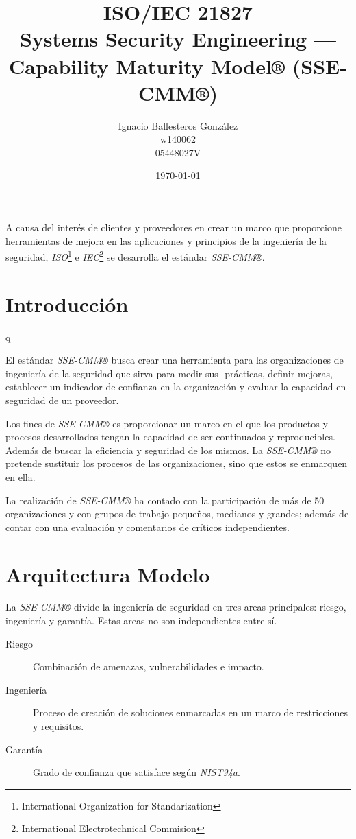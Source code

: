 \documentclass[11pt,a4paper]{article}
\title{
  ISO/IEC 21827\\
  Systems Security Engineering — Capability Maturity Model® (SSE-CMM®)
}
\author{\begin{tabular}[center]{c}
          Ignacio Ballesteros González \\
          \small w140062 \\
          \small 05448027V \\
        \end{tabular}
      }
\date{\today}
\begin{document}
\maketitle

A causa del interés de clientes y proveedores en crear un marco que
proporcione herramientas de mejora en las aplicaciones y principios de
la ingeniería de la seguridad, \emph{ISO}\footnote{International
  Organization for Standarization} e \emph{IEC}\footnote{International
  Electrotechnical Commision} se desarrolla el estándar
\emph{SSE-CMM®}.

\section{Introducción}q
\label{sec:introduccion}

El estándar \emph{SSE-CMM®} busca crear una herramienta para las
organizaciones de ingeniería de la seguridad que sirva para medir sus-
prácticas, definir mejoras, establecer un indicador de confianza en la
organización y evaluar la capacidad en seguridad de un proveedor.

Los fines de \emph{SSE-CMM®} es proporcionar un marco en el que los
productos y procesos desarrollados tengan la capacidad de ser
continuados y reproducibles. Además de buscar la eficiencia y
seguridad de los mismos. La \emph{SSE-CMM®} no pretende sustituir los
procesos de las organizaciones, sino que estos se enmarquen en ella.

La realización de \emph{SSE-CMM®} ha contado con la participación de
más de 50 organizaciones y con grupos de trabajo pequeños, medianos y
grandes; además de contar con una evaluación y comentarios de críticos
independientes.

\section{Arquitectura Modelo}
\label{sec:arquitectura}

La \emph{SSE-CMM®} divide la ingeniería de seguridad en tres areas
principales: riesgo, ingeniería y garantía. Estas areas no son
independientes entre sí.

\begin{description}
\item[Riesgo] Combinación de amenazas, vulnerabilidades e impacto.
\item[Ingeniería] Proceso de creación de soluciones enmarcadas en un
  marco de restricciones y requisitos.
\item[Garantía] Grado de confianza que satisface según \emph{NIST94a}.
\end{description}
\end{document}
